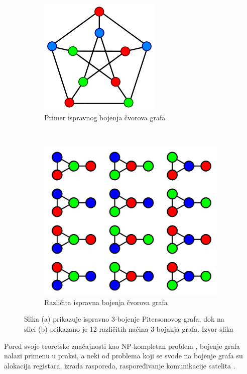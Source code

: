 \documentclass[a4paper]{article}
\begin{document}
\begin{figure}[h!]
	\centering

	\begin{subfigure}[normla]{0.3\textwidth}
		\includegraphics[scale=0.3]{bojene_grafa1}
		\caption{Primer ispravnog bojenja čvorova grafa}
		\label{bojenje_grafa1}
	\end{subfigure}
	~
	\begin{subfigure}[normla]{0.3\textwidth}
		\includegraphics[scale=0.1]{bojenje_grafa2}
		\caption{Različita ispravna bojenja čvorova grafa}
		\label{bojenje_grafa2}
	\end{subfigure}
		\caption{Slika (a) prikazuje ispravno 3-bojenje Pitersonovog grafa, dok na slici (b) prikazano je 12 različitih načina 3-bojanja grafa. Izvor slika \cite{graph_coloring} }
\label{bojene_grafa}
\end{figure}

Pored svoje teoretske značajnosti kao NP-kompletan problem \cite{zivkovic_algoritmi}, bojenje grafa nalazi primenu u praksi, a neki od problema koji se svode na bojenje grafa su alokacija registara, izrada rasporeda, raspoređivanje komunikacije satelita \cite{lu2010memetic}.
\end{document}
